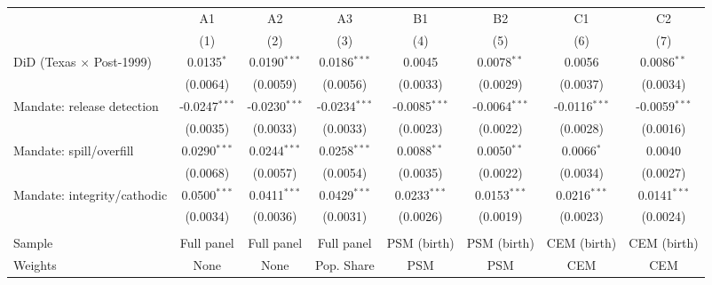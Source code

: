 
\begingroup
\centering
\begin{tabular}{lccccccc}
   \toprule
                                   & A1                 & A2              & A3              & B1              & B2              & C1              & C2 \\   
                                   & (1)                & (2)             & (3)             & (4)             & (5)             & (6)             & (7)\\  
   \midrule 
   DiD (Texas $\times$ Post-1999)  & 0.0135$^{*}$       & 0.0190$^{***}$  & 0.0186$^{***}$  & 0.0045          & 0.0078$^{**}$   & 0.0056          & 0.0086$^{**}$\\   
                                   & (0.0064)           & (0.0059)        & (0.0056)        & (0.0033)        & (0.0029)        & (0.0037)        & (0.0034)\\   
   Mandate: release detection      & -0.0247$^{***}$    & -0.0230$^{***}$ & -0.0234$^{***}$ & -0.0085$^{***}$ & -0.0064$^{***}$ & -0.0116$^{***}$ & -0.0059$^{***}$\\   
                                   & (0.0035)           & (0.0033)        & (0.0033)        & (0.0023)        & (0.0022)        & (0.0028)        & (0.0016)\\   
   Mandate: spill/overfill         & 0.0290$^{***}$     & 0.0244$^{***}$  & 0.0258$^{***}$  & 0.0088$^{**}$   & 0.0050$^{**}$   & 0.0066$^{*}$    & 0.0040\\   
                                   & (0.0068)           & (0.0057)        & (0.0054)        & (0.0035)        & (0.0022)        & (0.0034)        & (0.0027)\\   
   Mandate: integrity/cathodic     & 0.0500$^{***}$     & 0.0411$^{***}$  & 0.0429$^{***}$  & 0.0233$^{***}$  & 0.0153$^{***}$  & 0.0216$^{***}$  & 0.0141$^{***}$\\   
                                   & (0.0034)           & (0.0036)        & (0.0031)        & (0.0026)        & (0.0019)        & (0.0023)        & (0.0024)\\   
   \midrule &  &  &  &  &  &  & \\
   Sample                          & Full panel         & Full panel      & Full panel      & PSM (birth)     & PSM (birth)     & CEM (birth)     & CEM (birth)\\  
   Weights                         & None               & None            & Pop. Share      & PSM             & PSM             & CEM             & CEM\\  

\end{tabular}
